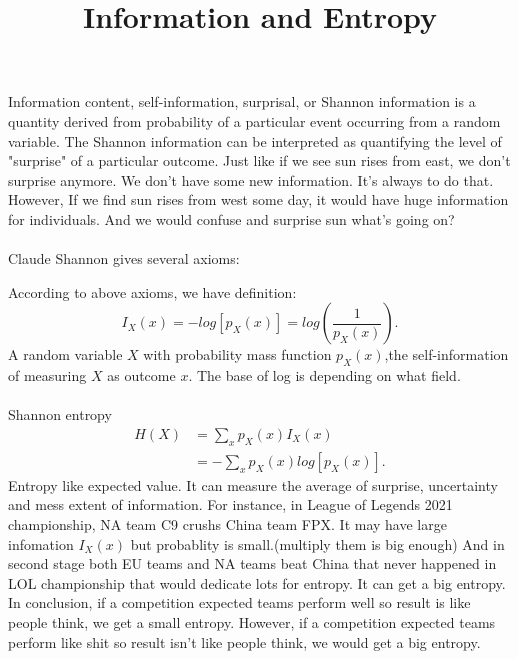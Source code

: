 \documentclass[12pt]{article}
\title{Information and Entropy}
\theoremstyle{definition}
\begin{document}
	Information content, self-information, surprisal, or Shannon information is a quantity derived from probability of a particular event occurring from a random variable. The Shannon information can be interpreted as quantifying the level of "surprise" of a particular outcome. Just like if we see sun rises from east, we don't surprise anymore. We don't have some new information. It's always to do that. However, If we find sun rises from west some day, it would have huge information for individuals. And we would confuse and surprise sun what's going on? \\ \\
	Claude Shannon gives several axioms:

	According to above axioms, we have definition:
	\[
		I_{X}(x) = -log[p_{X}(x)] = log\left (  \frac{1}{p_{X}(x)} \right ) 
	.\] 
	A random variable $X$ with probability mass function $p_{X}(x)$,the self-information of measuring $X$ as outcome $x$. The base of log is depending on what field. \\ \\
	Shannon entropy
	\begin{align*}
		H(X) & = \sum_{x}p_{X}(x)I_{X}(x) \\
			 & = -\sum_{x}p_{X}(x)log[p_{X}(x)].
	\end{align*}
	Entropy like expected value. It can measure the average of surprise, uncertainty and mess extent of information. For instance, in League of Legends 2021 championship, NA team C9 crushs China team FPX. It may have large infomation  $I_{X}(x)$ but probablity is small.(multiply them is big enough) And in second stage both EU teams and NA teams beat China that never happened in LOL championship that would dedicate lots for entropy. It can get a big entropy.\\
	In conclusion, if a competition expected teams perform well so result is like people think, we get a small entropy. However, if  a competition expected teams perform like shit so result isn't like people think, we would get a big entropy.
\end{document}
